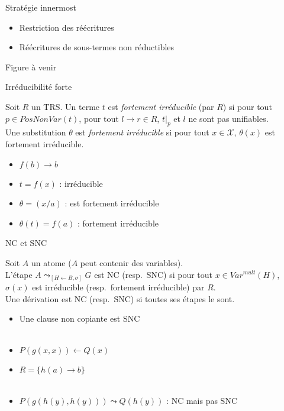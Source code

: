 \begin{frame}{Stratégie innermost}
  \begin{itemize}
  \item Restriction des réécritures
  \item Réécritures de sous-termes non réductibles
  \end{itemize}
  \begin{center}
    Figure à venir
  \end{center}
\end{frame}

\begin{frame}{Irréducibilité forte}
  \begin{Definition}
    Soit $R$ un TRS.
    Un terme $t$ est {\em fortement irréducible} (par $R$) si
    pour tout $p \in \textit{PosNonVar}(t)$, pour tout $l \rightarrow r \in R$,
    $t|_p$ et $l$ ne sont pas unifiables.\\
    Une substitution $\theta$ est {\em fortement irréducible} si
    pour tout $x \in \mathcal{X}$, $\theta(x)$ est fortement irréducible.
  \end{Definition}
  \begin{itemize}
  \item {} $f(b) \rightarrow b$
  \item {} $t = f(x)$ :  irréducible
  \item {} $\theta = (x/a)$ :  est fortement irréducible
  \item {} $\theta(t) = f(a)$ :  fortement irréducible
  \end{itemize}
\end{frame}

\begin{frame}{NC et SNC}
  \begin{Definition}
    Soit $A$ un atome ($A$ peut contenir des variables).\\
    L'étape $A \leadsto_{[H\leftarrow B,\sigma]} G$ est NC (resp.\ SNC) si
    pour tout $x \in Var^{mult}(H)$, $\sigma(x)$ est irréducible (resp.\ fortement irréducible) par $R$.\\
    Une dérivation est NC (resp.\ SNC) si toutes ses étapes le sont.
  \end{Definition}
  \begin{itemize}[<+->]
  \item Une clause non copiante est SNC \\~
    
  \item $P(g(x,x)) \leftarrow Q(x)$
  \item $R = \{h(a) \rightarrow b\}$ \\~

  \item $P(g(h(y),h(y))) \leadsto Q(h(y))$ : NC mais pas SNC
  \end{itemize}
\end{frame}


